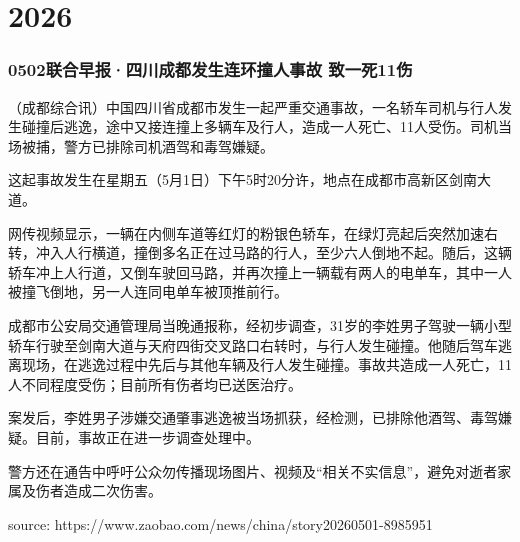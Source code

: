 \part{2026}
\section{
    0502联合早报·四川成都发生连环撞人事故 致一死11伤
} {
    \setlength{\parindent}{2em}
    （成都综合讯）中国四川省成都市发生一起严重交通事故，一名轿车司机与行人发生碰撞后逃逸，途中又接连撞上多辆车及行人，造成一人死亡、11人受伤。司机当场被捕，警方已排除司机酒驾和毒驾嫌疑。

这起事故发生在星期五（5月1日）下午5时20分许，地点在成都市高新区剑南大道。

网传视频显示，一辆在内侧车道等红灯的粉银色轿车，在绿灯亮起后突然加速右转，冲入人行横道，撞倒多名正在过马路的行人，至少六人倒地不起。随后，这辆轿车冲上人行道，又倒车驶回马路，并再次撞上一辆载有两人的电单车，其中一人被撞飞倒地，另一人连同电单车被顶推前行。

成都市公安局交通管理局当晚通报称，经初步调查，31岁的李姓男子驾驶一辆小型轿车行驶至剑南大道与天府四街交叉路口右转时，与行人发生碰撞。他随后驾车逃离现场，在逃逸过程中先后与其他车辆及行人发生碰撞。事故共造成一人死亡，11人不同程度受伤；目前所有伤者均已送医治疗。

案发后，李姓男子涉嫌交通肇事逃逸被当场抓获，经检测，已排除他酒驾、毒驾嫌疑。目前，事故正在进一步调查处理中。

警方还在通告中呼吁公众勿传播现场图片、视频及“相关不实信息”，避免对逝者家属及伤者造成二次伤害。

source: https://www.zaobao.com/news/china/story20260501-8985951
}